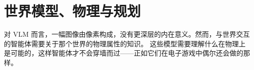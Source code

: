
\section{世界模型、物理与规划}\label{sec:world}

对 VLM 而言，一幅图像由像素构成，没有更深层的内在意义。然而，与世界交互的智能体需要关于那个世界的物理属性的知识。%
这些模型需要理解什么在物理上是可能的，这样智能体才不会穿墙而过——正如它们在电子游戏中偶尔还会做的那样。%





